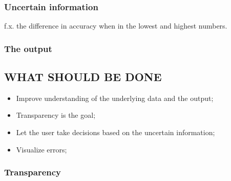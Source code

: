 \subsubsection{Uncertain information}
f.x. the difference in accuracy when in the lowest and highest numbers.

\subsubsection{The output}


\subsection{WHAT SHOULD BE DONE}
\begin{itemize}
\item Improve understanding of the underlying data and the output;
\item Transparency is the goal;
\item Let the user take decisions based on the uncertain information;
\item Visualize errors;
\end{itemize}

\subsubsection{Transparency}

